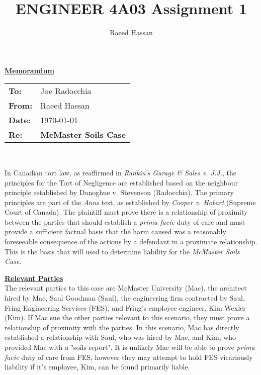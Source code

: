 \documentclass[12pt,letterpaper]{article}
\title{ENGINEER 4A03 Assignment 1}
\author{Raeed Hassan}
\begin{document}
\maketitle
\clearpage

\begin{center}
	\textbf{\underline{Memorandum}}
\end{center}
\begin{tabular}{ll}
	\textbf{To:}	& Joe Radocchia\\
	\textbf{From:}	& Raeed Hassan\\
	\textbf{Date:}	& \today\\
	\textbf{Re:}	& \textbf{McMaster Soils Case}\\
\end{tabular}
\\\par
In Canadian tort law, as reaffirmed in \textit{Rankin's Garage \& Sales v. J.J.}, the principles for the Tort of Negligence are established based on the neighbour principle established by Donoghue v. Stevenson (Radocchia). The primary principles are part of the \textit{Anns} test, as established by \textit{Cooper v. Hobart} (Supreme Court of Canada). The plaintiff must prove there is a relationship of proximity between the parties that should establish a \textit{prima facie} duty of care and must provide a sufficient factual basis that the harm caused was a reasonably foreseeable consequence of the actions by a defendant in a proximate relationship. This is the basis that will used to determine liability for the \textit{McMaster Soils Case}.

\par
\textbf{\underline{Relevant Parties}}\\
\indent
The relevant parties to this case are McMaster University (Mac), the architect hired by Mac, Saul Goodman (Saul), the engineering firm contracted by Saul, Fring Engineering Services (FES), and Fring's employee engineer, Kim Wexler (Kim). If Mac sue the other parties relevant to this scenario, they must prove a relationship of proximity with the parties. In this scenario, Mac has directly established a relationship with Saul, who was hired by Mac, and Kim, who provided Mac with a "soils report". It is unlikely Mac will be able to prove \textit{prima facie} duty of care from FES, however they may attempt to hold FES vicariously liability if it's employee, Kim, can be found primarily liable.
\end{document}
